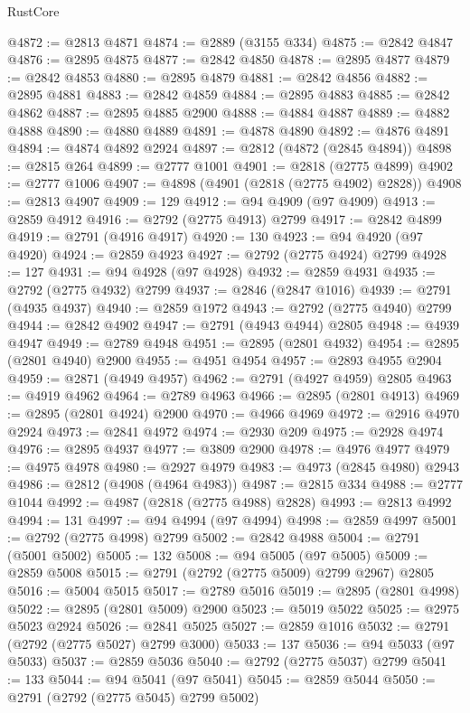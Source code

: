 \begin{lexlean}{RustCore}
\begin{coremodule}
@4872 := @2813 @4871
@4874 := @2889 (@3155 @334)
@4875 := @2842 @4847
@4876 := @2895 @4875
@4877 := @2842 @4850
@4878 := @2895 @4877
@4879 := @2842 @4853
@4880 := @2895 @4879
@4881 := @2842 @4856
@4882 := @2895 @4881
@4883 := @2842 @4859
@4884 := @2895 @4883
@4885 := @2842 @4862
@4887 := @2895 @4885 @2900
@4888 := @4884 @4887
@4889 := @4882 @4888
@4890 := @4880 @4889
@4891 := @4878 @4890
@4892 := @4876 @4891
@4894 := @4874 @4892 @2924
@4897 := @2812 (@4872 (@2845 @4894))
@4898 := @2815 @264
@4899 := @2777 @1001
@4901 := @2818 (@2775 @4899)
@4902 := @2777 @1006
@4907 := @4898 (@4901 (@2818 (@2775 @4902) @2828))
@4908 := @2813 @4907
@4909 := 129
@4912 := @94 @4909 (@97 @4909)
@4913 := @2859 @4912
@4916 := @2792 (@2775 @4913) @2799
@4917 := @2842 @4899
@4919 := @2791 (@4916 @4917)
@4920 := 130
@4923 := @94 @4920 (@97 @4920)
@4924 := @2859 @4923
@4927 := @2792 (@2775 @4924) @2799
@4928 := 127
@4931 := @94 @4928 (@97 @4928)
@4932 := @2859 @4931
@4935 := @2792 (@2775 @4932) @2799
@4937 := @2846 (@2847 @1016)
@4939 := @2791 (@4935 @4937)
@4940 := @2859 @1972
@4943 := @2792 (@2775 @4940) @2799
@4944 := @2842 @4902
@4947 := @2791 (@4943 @4944) @2805
@4948 := @4939 @4947
@4949 := @2789 @4948
@4951 := @2895 (@2801 @4932)
@4954 := @2895 (@2801 @4940) @2900
@4955 := @4951 @4954
@4957 := @2893 @4955 @2904
@4959 := @2871 (@4949 @4957)
@4962 := @2791 (@4927 @4959) @2805
@4963 := @4919 @4962
@4964 := @2789 @4963
@4966 := @2895 (@2801 @4913)
@4969 := @2895 (@2801 @4924) @2900
@4970 := @4966 @4969
@4972 := @2916 @4970 @2924
@4973 := @2841 @4972
@4974 := @2930 @209
@4975 := @2928 @4974
@4976 := @2895 @4937
@4977 := @3809 @2900
@4978 := @4976 @4977
@4979 := @4975 @4978
@4980 := @2927 @4979
@4983 := @4973 (@2845 @4980) @2943
@4986 := @2812 (@4908 (@4964 @4983))
@4987 := @2815 @334
@4988 := @2777 @1044
@4992 := @4987 (@2818 (@2775 @4988) @2828)
@4993 := @2813 @4992
@4994 := 131
@4997 := @94 @4994 (@97 @4994)
@4998 := @2859 @4997
@5001 := @2792 (@2775 @4998) @2799
@5002 := @2842 @4988
@5004 := @2791 (@5001 @5002)
@5005 := 132
@5008 := @94 @5005 (@97 @5005)
@5009 := @2859 @5008
@5015 := @2791 (@2792 (@2775 @5009) @2799 @2967) @2805
@5016 := @5004 @5015
@5017 := @2789 @5016
@5019 := @2895 (@2801 @4998)
@5022 := @2895 (@2801 @5009) @2900
@5023 := @5019 @5022
@5025 := @2975 @5023 @2924
@5026 := @2841 @5025
@5027 := @2859 @1016
@5032 := @2791 (@2792 (@2775 @5027) @2799 @3000)
@5033 := 137
@5036 := @94 @5033 (@97 @5033)
@5037 := @2859 @5036
@5040 := @2792 (@2775 @5037) @2799
@5041 := 133
@5044 := @94 @5041 (@97 @5041)
@5045 := @2859 @5044
@5050 := @2791 (@2792 (@2775 @5045) @2799 @5002)

\end{coremodule}
\end{lexlean}
